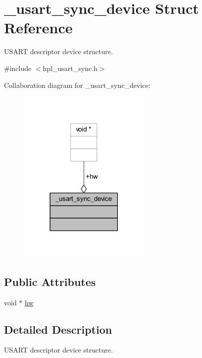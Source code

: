 \hypertarget{struct__usart__sync__device}{}\section{\+\_\+usart\+\_\+sync\+\_\+device Struct Reference}
\label{struct__usart__sync__device}


U\+S\+A\+RT descriptor device structure.  




{\ttfamily \#include $<$hpl\+\_\+usart\+\_\+sync.\+h$>$}



Collaboration diagram for \+\_\+usart\+\_\+sync\+\_\+device\+:\nopagebreak
\begin{figure}[H]
\begin{center}
\leavevmode
\includegraphics[width=182pt]{struct__usart__sync__device__coll__graph}
\end{center}
\end{figure}
\subsection*{Public Attributes}
\begin{DoxyCompactItemize}
\item 
void $\ast$ \hyperlink{struct__usart__sync__device_a299ec1be7b3e3f53a8f8921823a3480c}{hw}
\end{DoxyCompactItemize}


\subsection{Detailed Description}
U\+S\+A\+RT descriptor device structure. 

